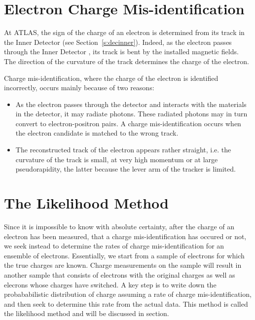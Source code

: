 \section{Electron Charge Mis-identification}\label{s:chargereasons}

At ATLAS, the sign of the charge of an electron is determined from its track in
the Inner Detector (see Section~\ref{s:decinner}). Indeed, as the electron
passes through the Inner Detector , its track is bent by the installed magnetic
fields. The direction of the curvature of the track determines the charge of
the electron.

Charge mis-identification, where the charge of the electron is identified
incorrectly, occurs mainly because of two reasons:

\begin{itemize}[label=]

	\item As the electron passes through the detector and interacts with the
	      materials in the detector, it may radiate photons. These radiated photons may
	      in turn convert to electron-positron pairs. A charge mis-identification occurs
	      when the electron candidate is matched to the wrong track.

	\item The reconstructed track of the electron appears rather straight, i.e. the
	      curvature of the track is small, at very high momentum or at large
	      pseudorapidity, the latter because the lever arm of the tracker is limited.

\end{itemize}

\section{The Likelihood Method}\label{s:cllhmethod}


Since it is impossible to know with absolute certainty, after the charge of an
electron has been measured, that a charge mis-identification has occured or
not, we seek instead to determine the rates of charge mis-identification for an
ensemble of electrons. Essentially, we start from a sample of electrons for
which the true charges are known. Charge measurements on the sample will result
in another sample that consists of electrons with the original charges as well
as elecrons whose charges have switched. A key step is to write down the
probababilistic distribution of charge assuming a rate of charge
mis-identification, and then seek to determine this rate from the actual data.
This method is called the likelihood method and will be discussed in section.

